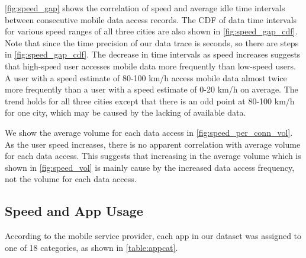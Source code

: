 \autoref{fig:speed_gap} shows the correlation of speed and average idle time intervals between consecutive mobile data access records.  The CDF of data time intervals for various speed ranges of all three cities are also shown in \autoref{fig:speed_gap_cdf}. Note that since the time precision of our data trace is seconds, so there are steps in \autoref{fig:speed_gap_cdf}. The decrease in time intervals as speed increases suggests that high-speed user accesses mobile data more frequently than low-speed users. A user with a speed estimate of 80-100 km/h access mobile data almost twice more frequently than a user with a speed estimate of 0-20 km/h on average. The trend holds for all three cities except that there is an odd point at 80-100 km/h for one city, which may be caused by the lacking of available data.

We show the average volume for each data access in \autoref{fig:speed_per_conn_vol}. As the user speed increases, there is no apparent correlation with average volume for each data access. This suggests that increasing in the average volume which is shown in \autoref{fig:speed_vol} is mainly cause by the increased data access frequency, not the volume for each data access.

\subsection{Speed and App Usage}

According to the mobile service provider, each app in our dataset was assigned to one of 18 categories, as shown in \autoref{table:appcat}. 

